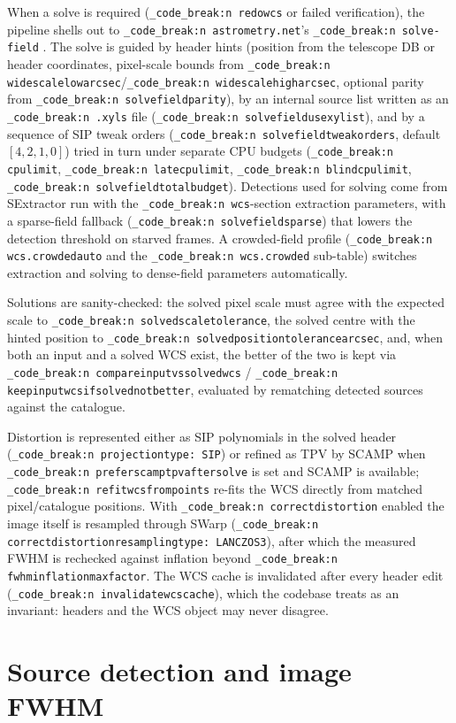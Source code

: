 \documentclass[11pt,a4paper]{article}
\renewcommand{\_}{\autophotunderscore\allowbreak}
\DeclareRobustCommand{\code}[1]{\texttt{\autophot_code_break:n {#1}}}
\begin{document}
When a solve is required (\code{redo\_wcs} or failed verification), the
pipeline shells out to \code{astrometry.net}'s \code{solve-field}
\citep{lang2010astrometry}. The solve is guided by header hints
(position from the telescope DB or header coordinates, pixel-scale bounds
from \code{wide\_scale\_low\_arcsec}\slash\code{wide\_scale\_high\_arcsec},
optional parity from \code{solve\_field\_parity}), by an internal source
list written as an \code{.xyls} file
(\code{solve\_field\_use\_xylist}), and by a sequence of SIP tweak orders
(\code{solve\_field\_tweak\_orders}, default $[4,2,1,0]$) tried in turn
under separate CPU budgets (\code{cpulimit}, \code{late\_cpulimit},
\code{blind\_cpulimit}, \code{solve\_field\_total\_budget}). Detections
used for solving come from SExtractor run with the \code{wcs}-section
extraction parameters, with a sparse-field fallback
(\code{solve\_field\_sparse\_*}) that lowers the detection threshold on
starved frames. A crowded-field profile
(\code{wcs.crowded\_auto} and the \code{wcs.crowded} sub-table) switches
extraction and solving to dense-field parameters automatically.

Solutions are sanity-checked: the solved pixel scale must agree with the
expected scale to \code{solved\_scale\_tolerance}, the solved centre with
the hinted position to \code{solved\_position\_tolerance\_arcsec}, and,
when both an input and a solved WCS exist, the better of the two is kept
via \code{compare\_input\_vs\_solved\_wcs} /
\code{keep\_input\_wcs\_if\_solved\_not\_better}, evaluated by rematching
detected sources against the catalogue.

Distortion is represented either as SIP polynomials
\citep{shupe2005sip} in the solved header (\code{projection\_type: SIP})
or refined as TPV by SCAMP \citep{bertin2006scamp} when
\code{prefer\_scamp\_tpv\_after\_solve} is set and SCAMP is available;
\code{refit\_wcs\_from\_points} re-fits the WCS directly from matched
pixel/catalogue positions. With \code{correct\_distortion} enabled the
image itself is resampled through SWarp \citep{bertin2010swarp}
(\code{correct\_distortion\_resampling\_type: LANCZOS3}), after which the
measured FWHM is rechecked against inflation beyond
\code{fwhm\_inflation\_max\_factor}. The WCS cache is invalidated after
every header edit (\code{invalidate\_wcs\_cache}), which the codebase
treats as an invariant: headers and the WCS object may never disagree.

\section{Source detection and image FWHM}
\label{sec:fwhm}
\end{document}
